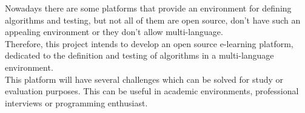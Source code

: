 Nowadays there are some platforms that provide an environment for defining algorithms and testing, but not all of them are open source, don't have such an appealing environment or they don't allow multi-language.
\\
Therefore, this project intends to develop an open source e-learning platform, dedicated to the definition and testing of algorithms in a multi-language environment.
\\
This platform will have several challenges which can be solved for study or evaluation purposes. This can be useful in academic environments, professional interviews or programming enthusiast.\nocite{ref2}

